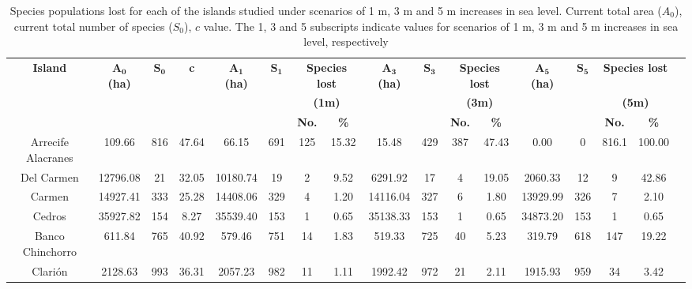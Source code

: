 \documentclass{article} %
\begin{document}
\begin{table}
\caption{Species populations lost for each of the islands studied under scenarios of 1 m, 3 m and 5 m increases in sea level. Current total area ($A_{0}$), current total number of species ($S_{0}$), $c$ value. The 1, 3 and 5 subscripts indicate values for scenarios of 1 m, 3 m and 5 m increases in sea level, respectively}
\vspace{2mm}
\begin{adjustwidth}{-2.6cm}{}
\setlength{\tabcolsep}{4pt}
\begin{footnotesize}
\begin{tabular}{ccccccccccccccccc}
\hline 
\multirow{3}{*}{\textbf{Island}} & \multirow{3}{*}{\textbf{$\mathbf{A_{0}}$ (ha)}} & \multirow{3}{*}{\textbf{$\mathbf{S_{0}}$}} & \multirow{3}{*}{\textbf{c}} & \multirow{3}{*}{\textbf{$\mathbf{A_{1}}$ (ha)}} & \multirow{3}{*}{\textbf{$\mathbf{S_{1}}$}} & \multicolumn{2}{c}{\textbf{Species lost}} & \multirow{3}{*}{\textbf{$\mathbf{A_{3}}$ (ha)}} & \multirow{3}{*}{\textbf{$\mathbf{S_{3}}$}} & \multicolumn{2}{c}{\textbf{Species lost}} & \multirow{3}{*}{\textbf{$\mathbf{A_{5}}$ (ha)}} & \multirow{3}{*}{\textbf{$\mathbf{S_{5}}$}} &\multicolumn{2}{c}{\textbf{Species lost}} \\
 & & & & & &\multicolumn{2}{c}{\textbf{(1m)}}& & &\multicolumn{2}{c}{\textbf{(3m)}}& & &\multicolumn{2}{c}{\textbf{(5m)}} \\
 & & & & & &\textbf{No.} &\textbf{\%} & & &\textbf{No.} &\textbf{\%} & & &\textbf{No.} &\textbf{\%} \\
\hline 
Arrecife Alacranes &    109.66 &  816 &  47.64 &     66.15 &  691 &  125 &  15.32 &     15.48 &  429 &  387 &  47.43 &      0.00 &    0 &  816.1 &  100.00 \\
Del Carmen &  12796.08 &   21 &  32.05 &  10180.74 &   19 &    2 &   9.52 &   6291.92 &   17 &    4 &  19.05 &   2060.33 &   12 &      9 &   42.86 \\
Carmen &  14927.41 &  333 &  25.28 &  14408.06 &  329 &    4 &   1.20 &  14116.04 &  327 &    6 &   1.80 &  13929.99 &  326 &      7 &    2.10 \\
Cedros &  35927.82 &  154 &   8.27 &  35539.40 &  153 &    1 &   0.65 &  35138.33 &  153 &    1 &   0.65 &  34873.20 &  153 &      1 &    0.65 \\
Banco Chinchorro &    611.84 &  765 &  40.92 &    579.46 &  751 &   14 &   1.83 &    519.33 &  725 &   40 &   5.23 &    319.79 &  618 &    147 &   19.22 \\
Clarión &   2128.63 &  993 &  36.31 &   2057.23 &  982 &   11 &   1.11 &   1992.42 &  972 &   21 &   2.11 &   1915.93 &  959 &     34 &    3.42 \\

\end{tabular}
\end{footnotesize}
\end{adjustwidth}
\end{table}
\end{document}
